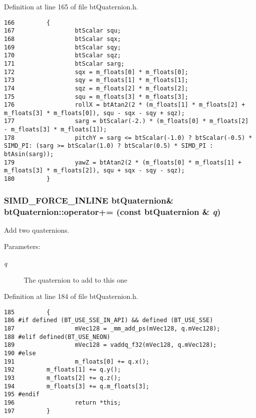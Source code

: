 Definition at line 165 of file btQuaternion.h.

\begin{Code}\begin{verbatim}166         {
167                 btScalar squ;
168                 btScalar sqx;
169                 btScalar sqy;
170                 btScalar sqz;
171                 btScalar sarg;
172                 sqx = m_floats[0] * m_floats[0];
173                 sqy = m_floats[1] * m_floats[1];
174                 sqz = m_floats[2] * m_floats[2];
175                 squ = m_floats[3] * m_floats[3];
176                 rollX = btAtan2(2 * (m_floats[1] * m_floats[2] + m_floats[3] * m_floats[0]), squ - sqx - sqy + sqz);
177                 sarg = btScalar(-2.) * (m_floats[0] * m_floats[2] - m_floats[3] * m_floats[1]);
178                 pitchY = sarg <= btScalar(-1.0) ? btScalar(-0.5) * SIMD_PI: (sarg >= btScalar(1.0) ? btScalar(0.5) * SIMD_PI : btAsin(sarg));
179                 yawZ = btAtan2(2 * (m_floats[0] * m_floats[1] + m_floats[3] * m_floats[2]), squ + sqx - sqy - sqz);
180         }
\end{verbatim}
\end{Code}


\hypertarget{classbt_quaternion_1212e4cbaa71da187984d3c174a4cc04}{
\subsubsection[operator+=]{\setlength{\rightskip}{0pt plus 5cm}SIMD\_\-FORCE\_\-INLINE {\bf btQuaternion}\& btQuaternion::operator+= (const {\bf btQuaternion} \& {\em q})}}
\label{classbt_quaternion_1212e4cbaa71da187984d3c174a4cc04}


Add two quaternions. 

\begin{Desc}
\item[Parameters:]
\begin{description}
\item[{\em q}]The quaternion to add to this one \end{description}
\end{Desc}


Definition at line 184 of file btQuaternion.h.

\begin{Code}\begin{verbatim}185         {
186 #if defined (BT_USE_SSE_IN_API) && defined (BT_USE_SSE)
187                 mVec128 = _mm_add_ps(mVec128, q.mVec128);
188 #elif defined(BT_USE_NEON)
189                 mVec128 = vaddq_f32(mVec128, q.mVec128);
190 #else   
191                 m_floats[0] += q.x(); 
192         m_floats[1] += q.y(); 
193         m_floats[2] += q.z(); 
194         m_floats[3] += q.m_floats[3];
195 #endif
196                 return *this;
197         }
\end{verbatim}
\end{Code}


